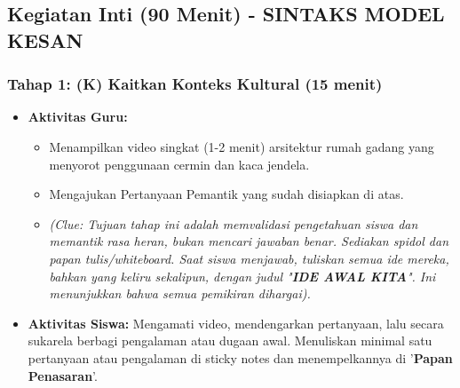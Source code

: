\documentclass[12pt,a4paper]{article}
\begin{document}
\subsection{Kegiatan Inti (90 Menit) - SINTAKS MODEL KESAN}

\subsubsection{Tahap 1: (K) Kaitkan Konteks Kultural (15 menit)}
\begin{itemize}
\item \textbf{Aktivitas Guru:}
    \begin{itemize}
    \item Menampilkan video singkat (1-2 menit) arsitektur rumah gadang yang menyorot penggunaan cermin dan kaca jendela.
    \item Mengajukan Pertanyaan Pemantik yang sudah disiapkan di atas.
    \item \textit{(Clue: Tujuan tahap ini adalah memvalidasi pengetahuan siswa dan memantik rasa heran, bukan mencari jawaban benar. Sediakan spidol dan papan tulis/whiteboard. Saat siswa menjawab, tuliskan semua ide mereka, bahkan yang keliru sekalipun, dengan judul "\textbf{IDE AWAL KITA}". Ini menunjukkan bahwa semua pemikiran dihargai).}
    \end{itemize}
\item \textbf{Aktivitas Siswa:} Mengamati video, mendengarkan pertanyaan, lalu secara sukarela berbagi pengalaman atau dugaan awal. Menuliskan minimal satu pertanyaan atau pengalaman di sticky notes dan menempelkannya di '\textbf{Papan Penasaran}'.
\end{itemize}
\end{document}
